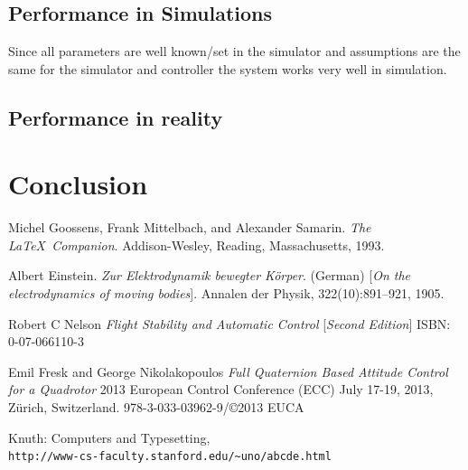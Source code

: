 \documentclass{article}
\begin{document}
\subsection{Performance in Simulations}
Since all parameters are well known/set in the simulator and assumptions are the same for the simulator and controller the system works very well in simulation.

\subsection{Performance in reality}

\section{Conclusion}

\begin{thebibliography}{9}
Michel Goossens, Frank Mittelbach, and Alexander Samarin. 
\textit{The \LaTeX\ Companion}. 
Addison-Wesley, Reading, Massachusetts, 1993.

Albert Einstein. 
\textit{Zur Elektrodynamik bewegter K{\"o}rper}. (German) 
[\textit{On the electrodynamics of moving bodies}]. 
Annalen der Physik, 322(10):891–921, 1905.

Robert C Nelson
\textit{Flight Stability and Automatic Control}
[\textit{Second Edition}]
ISBN: 0-07-066110-3

Emil Fresk and George Nikolakopoulos
\textit{Full Quaternion Based Attitude Control for a Quadrotor}
2013 European Control Conference (ECC)
July 17-19, 2013, Zürich, Switzerland.
978-3-033-03962-9/©2013 EUCA

 
Knuth: Computers and Typesetting,
\\\texttt{http://www-cs-faculty.stanford.edu/\~{}uno/abcde.html}
\end{thebibliography}
\end{document}
